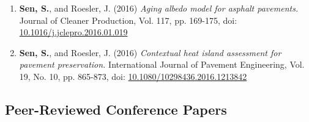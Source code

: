 \documentclass[12pt]{article}
\begin{document}
\begin{enumerate}
	\item \textbf{Sen, S.}, and Roesler, J. (2016) \textit{Aging albedo model for asphalt pavements.} Journal of Cleaner Production, Vol. 117, pp. 169-175, doi: \href{http://dx.doi.org/10.1016/j.jclepro.2016.01.019}{10.1016/j.jclepro.2016.01.019}
	\item \textbf{Sen, S.}, and Roesler, J. (2016) \textit{Contextual heat island assessment for pavement preservation.} International Journal of Pavement Engineering, Vol. 19, No. 10, pp. 865-873, doi: \href{https://www.tandfonline.com/doi/full/10.1080/10298436.2016.1213842}{10.1080/10298436.2016.1213842}
\end{enumerate} 

\hfill
\subsection*{Peer-Reviewed Conference Papers}
\end{document}
